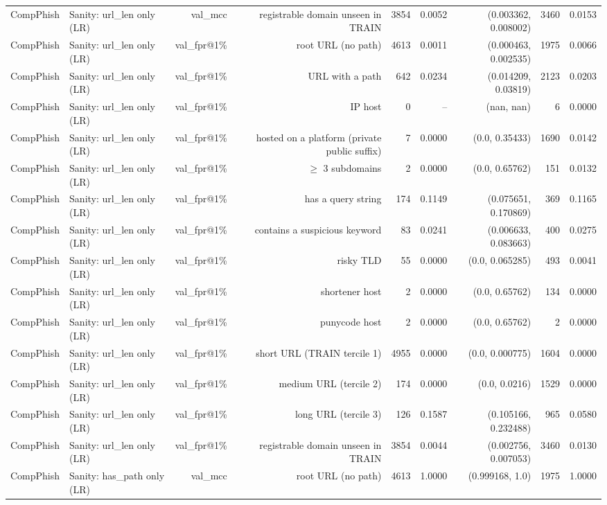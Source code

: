 \begin{table}[t]
\begin{tabular}{llrrrrrrr}
CompPhish & Sanity: url\_len only (LR) & val\_mcc & registrable domain unseen in TRAIN & 3854 & 0.0052 & (0.003362, 0.008002) & 3460 & 0.0153 \\
CompPhish & Sanity: url\_len only (LR) & val\_fpr@1\% & root URL (no path) & 4613 & 0.0011 & (0.000463, 0.002535) & 1975 & 0.0066 \\
CompPhish & Sanity: url\_len only (LR) & val\_fpr@1\% & URL with a path & 642 & 0.0234 & (0.014209, 0.03819) & 2123 & 0.0203 \\
CompPhish & Sanity: url\_len only (LR) & val\_fpr@1\% & IP host & 0 & -- & (nan, nan) & 6 & 0.0000 \\
CompPhish & Sanity: url\_len only (LR) & val\_fpr@1\% & hosted on a platform (private public suffix) & 7 & 0.0000 & (0.0, 0.35433) & 1690 & 0.0142 \\
CompPhish & Sanity: url\_len only (LR) & val\_fpr@1\% & $\geq$ 3 subdomains & 2 & 0.0000 & (0.0, 0.65762) & 151 & 0.0132 \\
CompPhish & Sanity: url\_len only (LR) & val\_fpr@1\% & has a query string & 174 & 0.1149 & (0.075651, 0.170869) & 369 & 0.1165 \\
CompPhish & Sanity: url\_len only (LR) & val\_fpr@1\% & contains a suspicious keyword & 83 & 0.0241 & (0.006633, 0.083663) & 400 & 0.0275 \\
CompPhish & Sanity: url\_len only (LR) & val\_fpr@1\% & risky TLD & 55 & 0.0000 & (0.0, 0.065285) & 493 & 0.0041 \\
CompPhish & Sanity: url\_len only (LR) & val\_fpr@1\% & shortener host & 2 & 0.0000 & (0.0, 0.65762) & 134 & 0.0000 \\
CompPhish & Sanity: url\_len only (LR) & val\_fpr@1\% & punycode host & 2 & 0.0000 & (0.0, 0.65762) & 2 & 0.0000 \\
CompPhish & Sanity: url\_len only (LR) & val\_fpr@1\% & short URL (TRAIN tercile 1) & 4955 & 0.0000 & (0.0, 0.000775) & 1604 & 0.0000 \\
CompPhish & Sanity: url\_len only (LR) & val\_fpr@1\% & medium URL (tercile 2) & 174 & 0.0000 & (0.0, 0.0216) & 1529 & 0.0000 \\
CompPhish & Sanity: url\_len only (LR) & val\_fpr@1\% & long URL (tercile 3) & 126 & 0.1587 & (0.105166, 0.232488) & 965 & 0.0580 \\
CompPhish & Sanity: url\_len only (LR) & val\_fpr@1\% & registrable domain unseen in TRAIN & 3854 & 0.0044 & (0.002756, 0.007053) & 3460 & 0.0130 \\
CompPhish & Sanity: has\_path only (LR) & val\_mcc & root URL (no path) & 4613 & 1.0000 & (0.999168, 1.0) & 1975 & 1.0000 \\

\end{tabular}
\end{table}
